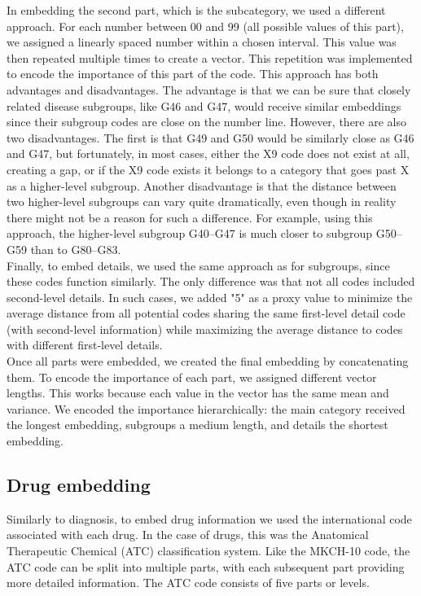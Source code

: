 In embedding the second part, which is the subcategory, we used a different approach. For each number between 00 and 99 (all possible values of this part), we assigned a linearly spaced number within a chosen interval. This value was then repeated multiple times to create a vector. This repetition was implemented to encode the importance of this part of the code. This approach has both advantages and disadvantages. The advantage is that we can be sure that closely related disease subgroups, like G46 and G47, would receive similar embeddings since their subgroup codes are close on the number line. However, there are also two disadvantages. The first is that G49 and G50 would be similarly close as G46 and G47, but fortunately, in most cases, either the X9 code does not exist at all, creating a gap, or if the X9 code exists it belongs to a category that goes past X as a higher-level subgroup. Another disadvantage is that the distance between two higher-level subgroups can vary quite dramatically, even though in reality there might not be a reason for such a difference. For example, using this approach, the higher-level subgroup G40–G47 is much closer to subgroup G50–G59 than to G80–G83.
\\

Finally, to embed details, we used the same approach as for subgroups, since these codes function similarly. The only difference was that not all codes included second-level details. In such cases, we added "5" as a proxy value to minimize the average distance from all potential codes sharing the same first-level detail code (with second-level information) while maximizing the average distance to codes with different first-level details.
\\

Once all parts were embedded, we created the final embedding by concatenating them. To encode the importance of each part, we assigned different vector lengths. This works because each value in the vector has the same mean and variance. We encoded the importance hierarchically: the main category received the longest embedding, subgroups a medium length, and details the shortest embedding.

\subsection{Drug embedding}
\label{drugEmb}

Similarly to diagnosis, to embed drug information we used the international code associated with each drug. In the case of drugs, this was the Anatomical Therapeutic Chemical (ATC) classification system. Like the MKCH-10 code, the ATC code can be split into multiple parts, with each subsequent part providing more detailed information. The ATC code consists of five parts or levels.
\\

